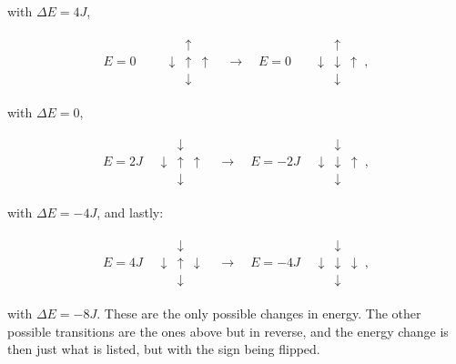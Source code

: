 \documentclass[reprint,english,notitlepage]{revtex4-1}  %
\begin{document}
with $\Delta E = 4J$,

\begin{align*}
E = 0 \quad \, \quad \begin{array}{ccc}
& \uparrow & \\
\downarrow & \uparrow & \uparrow \\
& \downarrow &
\end{array} \quad \to \quad E = 0 \,\,\,\, \quad \begin{array}{ccc}
& \uparrow & \\
\downarrow & \downarrow & \uparrow \\
& \downarrow &
\end{array} \, ,
\end{align*}

with $\Delta E = 0$, 

\begin{align*}
E = 2J \quad \begin{array}{ccc}
& \downarrow & \\
\downarrow & \uparrow & \uparrow \\
& \downarrow &
\end{array} \quad \to \quad E = -2J \quad \begin{array}{ccc}
& \downarrow & \\
\downarrow & \downarrow & \uparrow \\
& \downarrow &
\end{array} \, ,
\end{align*}

with $\Delta E = -4J$, and lastly:

\begin{align*}
E = 4J \quad \begin{array}{ccc}
& \downarrow & \\
\downarrow & \uparrow & \downarrow \\
& \downarrow &
\end{array} \quad \to \quad E = -4J \quad \begin{array}{ccc}
& \downarrow & \\
\downarrow & \downarrow & \downarrow \\
& \downarrow &
\end{array} \, ,
\end{align*}

with $\Delta E = -8J$. These are the only possible changes in energy. The other possible transitions are the ones above but in reverse, and the energy change is then just what is listed, but with the sign being flipped. 
\end{document}
